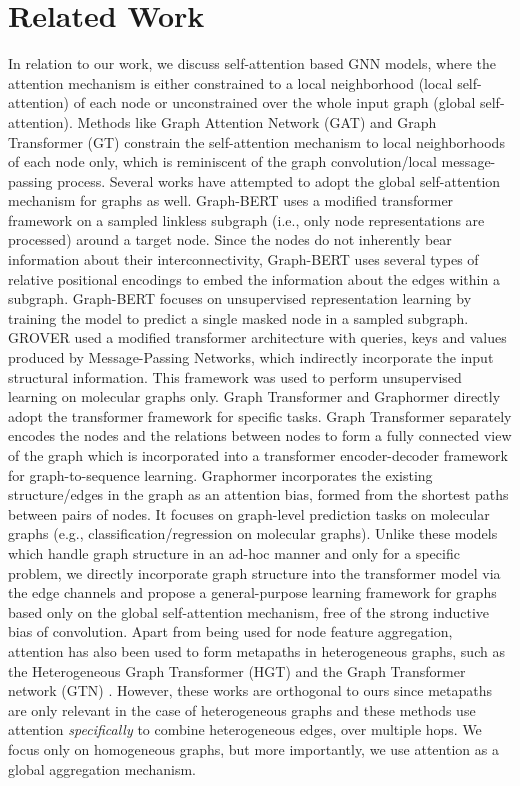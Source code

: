 \documentclass[sigconf,authorversion]{acmart}
\begin{document}
\section{Related Work}
In relation to our work, we discuss self-attention based GNN models, where the attention mechanism is either constrained to a local neighborhood (local self-attention) of each node or unconstrained over the whole input graph (global self-attention). Methods like Graph Attention Network (GAT) \citep{velivckovic2017graph} and Graph Transformer (GT) \citep{dwivedi2020generalization} constrain the self-attention mechanism to local neighborhoods of each node only, which is reminiscent of the graph convolution/local message-passing process. Several works have attempted to adopt the global self-attention mechanism for graphs as well. Graph-BERT \citep{zhang2020graph} uses a modified transformer framework on a sampled linkless subgraph (i.e., only node representations are processed) around a target node. Since the nodes do not inherently bear information about their interconnectivity, Graph-BERT uses several types of relative positional encodings to embed the information about the edges within a subgraph. Graph-BERT focuses on unsupervised representation learning by training the model to predict a single masked node in a sampled subgraph. GROVER \citep{rong2020self} used a modified transformer architecture with queries, keys and values produced by Message-Passing Networks, which indirectly incorporate the input structural information. This framework was used to perform unsupervised learning on molecular graphs only. Graph Transformer \citep{cai2020graph} and Graphormer \cite{ying2021transformers} directly adopt the transformer framework for specific tasks. Graph Transformer separately encodes the nodes and the relations between nodes to form a fully connected view of the graph which is incorporated into a transformer encoder-decoder framework for graph-to-sequence learning. Graphormer incorporates the existing structure/edges in the graph as an attention bias, formed from the shortest paths between pairs of nodes. It focuses on graph-level prediction tasks on molecular graphs (e.g., classification/regression on molecular graphs). Unlike these models which handle graph structure in an ad-hoc manner and only for a specific problem, we directly incorporate graph structure into the transformer model via the edge channels and propose a general-purpose learning framework for graphs based only on the global self-attention mechanism, free of the strong inductive bias of convolution. Apart from being used for node feature aggregation, attention has also been used to form metapaths in heterogeneous graphs, such as the Heterogeneous Graph Transformer (HGT) \citep{hu2020heterogeneous} and the Graph Transformer network (GTN) \citep{yun2019graph}. However, these works are orthogonal to ours since metapaths are only relevant in the case of heterogeneous graphs and these methods use attention \emph{specifically} to combine heterogeneous edges, over multiple hops. We focus only on homogeneous graphs, but more importantly, we use attention as a global aggregation mechanism. 
\end{document}

